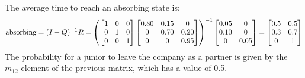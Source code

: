 \begin{example}
    The average time to reach an absorbing state is:
    \[\textnormal{absorbing}=(I-Q)^{-1}R=
    \left(  
        \begin{bmatrix}
            1       & 0     & 0  \\
            0       & 1     & 0  \\
            0       & 0     & 1  \\
        \end{bmatrix}
        \begin{bmatrix}
            0.80    & 0.15  & 0     \\
            0       & 0.70  & 0.20  \\
            0       & 0     & 0.95  \\
        \end{bmatrix}
    \right)^{-1}
    \begin{bmatrix}
        0.05    & 0     \\
        0.10    & 0     \\
        0       & 0.05  \\
    \end{bmatrix}
    =        
    \begin{bmatrix}
        0.5     & 0.5   \\
        0.3     & 0.7   \\
        0       & 1     \\
    \end{bmatrix}\]
    The probability for a junior to leave the company as a partner is given by the $m_{12}$ element of the previous matrix, which has a value of 0.5.
\end{example}